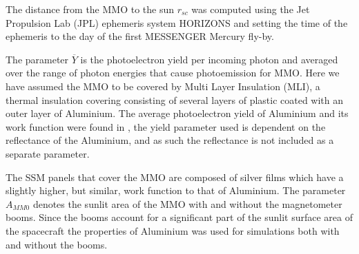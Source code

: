 The distance from the MMO to the sun $r_{sc}$ was computed using the Jet Propulsion Lab (JPL) ephemeris system HORIZONS and setting the time of the ephemeris to the day of the first MESSENGER Mercury fly-by.

The parameter $\overline{Y}$ is the photoelectron yield per incoming photon and averaged over the range of photon energies that cause photoemission for MMO. Here we have assumed the MMO to be covered by Multi Layer Insulation (MLI), a thermal insulation covering consisting of several layers of plastic coated with an outer layer of Aluminium. The average photoelectron yield of Aluminium and its work function were found in \parencite{Feuerbacher1972}, the yield parameter used is dependent on the reflectance of the Aluminium, and as such the reflectance is not included as a separate parameter. 

The SSM panels that cover the MMO are composed of silver films which have a slightly higher, but similar, work function to that of Aluminium. The parameter $A_{MM0}$ denotes the sunlit area of the MMO with and without the magnetometer booms. Since the booms account for a significant part of the sunlit surface area of the spacecraft the properties of Aluminium was used for simulations both with and without the booms.

\newpage
